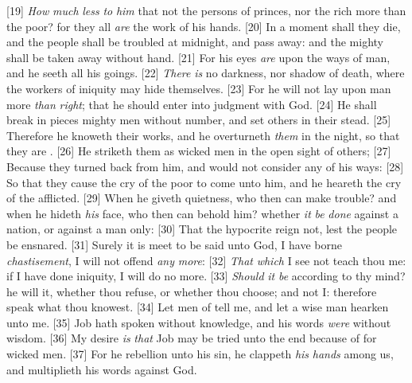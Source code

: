 [19] \textcolor[cmyk]{0.99998,1,0,0}{\emph{How} \emph{much} \emph{less} \emph{to} \emph{him} that  not the persons of princes, nor  the rich more than the poor? for they all \emph{are} the work of his hands.}
[20] \textcolor[cmyk]{0.99998,1,0,0}{In a moment shall they die, and the people shall be troubled at midnight, and pass away: and the mighty shall be taken away without hand.}
[21] \textcolor[cmyk]{0.99998,1,0,0}{For his eyes \emph{are} upon the ways of man, and he seeth all his goings.}
[22] \textcolor[cmyk]{0.99998,1,0,0}{\emph{There} \emph{is} no darkness, nor shadow of death, where the workers of iniquity may hide themselves.}
[23] \textcolor[cmyk]{0.99998,1,0,0}{For he will not lay upon man more \emph{than} \emph{right}; that he should enter into judgment with God.}
[24] \textcolor[cmyk]{0.99998,1,0,0}{He shall break in pieces mighty men without number, and set others in their stead.}
[25] \textcolor[cmyk]{0.99998,1,0,0}{Therefore he knoweth their works, and he overturneth \emph{them} in the night, so that they are .}
[26] \textcolor[cmyk]{0.99998,1,0,0}{He striketh them as wicked men in the open sight of others;}
[27] \textcolor[cmyk]{0.99998,1,0,0}{Because they turned back from him, and would not consider any of his ways:}
[28] \textcolor[cmyk]{0.99998,1,0,0}{So that they cause the cry of the poor to come unto him, and he heareth the cry of the afflicted.}
[29] \textcolor[cmyk]{0.99998,1,0,0}{When he giveth quietness, who then can make trouble? and when he hideth \emph{his} face, who then can behold him? whether \emph{it} \emph{be} \emph{done} against a nation, or against a man only:}
[30] \textcolor[cmyk]{0.99998,1,0,0}{That the hypocrite reign not, lest the people be ensnared.}
[31] \textcolor[cmyk]{0.99998,1,0,0}{Surely it is meet to be said unto God, I have borne \emph{chastisement}, I will not offend \emph{any} \emph{more}:}
[32] \textcolor[cmyk]{0.99998,1,0,0}{\emph{That} \emph{which} I see not teach thou me: if I have done iniquity, I will do no more.}
[33] \textcolor[cmyk]{0.99998,1,0,0}{\emph{Should} \emph{it} \emph{be} according to thy mind? he will  it, whether thou refuse, or whether thou choose; and not I: therefore speak what thou knowest.}
[34] \textcolor[cmyk]{0.99998,1,0,0}{Let men of  tell me, and let a wise man hearken unto me.}
[35] \textcolor[cmyk]{0.99998,1,0,0}{Job hath spoken without knowledge, and his words \emph{were} without wisdom.}
[36] \textcolor[cmyk]{0.99998,1,0,0}{My desire \emph{is} \emph{that} Job may be tried unto the end because of  for wicked men.}
[37] \textcolor[cmyk]{0.99998,1,0,0}{For he  rebellion unto his sin, he clappeth \emph{his} \emph{hands} among us, and multiplieth his words against God.}